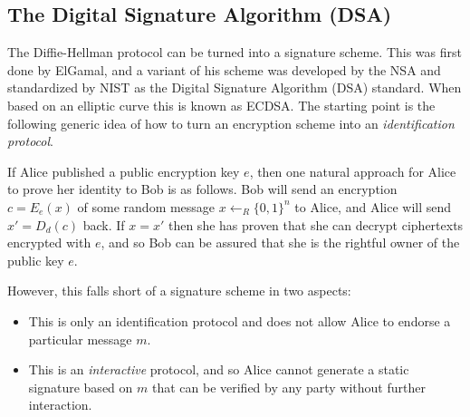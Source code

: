 \hypertarget{strongunforgabilitysigrem}{}

\subsection{The Digital Signature Algorithm
(DSA)}\label{The-Digital-Signature-Algorith}

The Diffie-Hellman protocol can be turned into a signature scheme. This
was first done by ElGamal, and a variant of his scheme was developed by
the NSA and standardized by NIST as the Digital Signature Algorithm
(DSA) standard. When based on an elliptic curve this is known as ECDSA.
The starting point is the following generic idea of how to turn an
encryption scheme into an \emph{identification protocol}.

If Alice published a public encryption key \(e\), then one natural
approach for Alice to prove her identity to Bob is as follows. Bob will
send an encryption \(c=E_e(x)\) of some random message
\(x \leftarrow_R \{0,1\}^n\) to Alice, and Alice will send \(x'=D_d(c)\)
back. If \(x=x'\) then she has proven that she can decrypt ciphertexts
encrypted with \(e\), and so Bob can be assured that she is the rightful
owner of the public key \(e\).

However, this falls short of a signature scheme in two aspects:

\begin{itemize}
\tightlist
\item
  This is only an identification protocol and does not allow Alice to
  endorse a particular message \(m\).\\
\item
  This is an \emph{interactive} protocol, and so Alice cannot generate a
  static signature based on \(m\) that can be verified by any party
  without further interaction.
\end{itemize}

